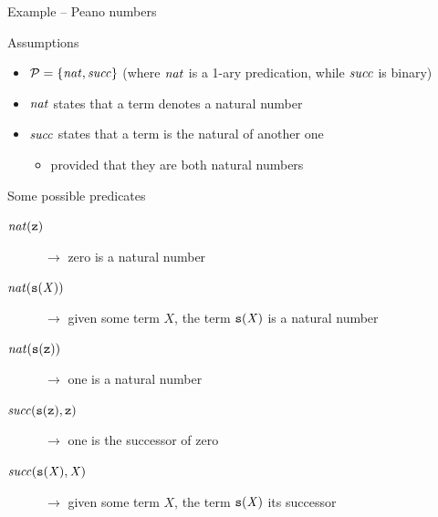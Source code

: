 \documentclass[presentation]{beamer}\mode<presentation>{\usetheme{AMSBolognaFC}}
\begin{document}
\begin{frame}{Example -- Peano numbers}
    \begin{block}{Assumptions}
        \begin{itemize}
            \item $\mathcal{P} = \{ \text{\textit{nat}}, \text{\textit{succ}} \}$ \hfill {\footnotesize(where $\text{\textit{nat}}$ is a 1-ary predication, while $\text{\textit{succ}}$ is binary)}
            \item $\text{\textit{nat}}$ states that a term denotes a \alert{natural} number
            \item $\text{\textit{succ}}$ states that a term is the \alert{natural} of another one
            \begin{itemize}
                \item provided that they are both natural numbers
            \end{itemize}
        \end{itemize}
    \end{block}
    \begin{exampleblock}{Some possible predicates}
        \begin{description}
            \item[$\text{\textit{nat}}(\mathtt{z})$] $\rightarrow$ zero is a natural number
            \item[$\text{\textit{nat}}(\mathtt{s}(\mathit{X}))$] $\rightarrow$ given some term $X$, the term $\mathtt{s}(\mathit{X})$ is a natural number
            \item[$\text{\textit{nat}}(\mathtt{s}(\mathtt{z}))$] $\rightarrow$ one is a natural number
            \item[$\text{\textit{succ}}(\mathtt{s}(\mathtt{z}), \mathtt{z})$] $\rightarrow$ one is the successor of zero
            \item[$\text{\textit{succ}}(\mathtt{s}(\mathit{X}), \mathit{X})$] $\rightarrow$ given some term $X$, the term $\mathtt{s}(\mathit{X})$ its successor
        \end{description}
    \end{exampleblock}
\end{frame}
\end{document}
